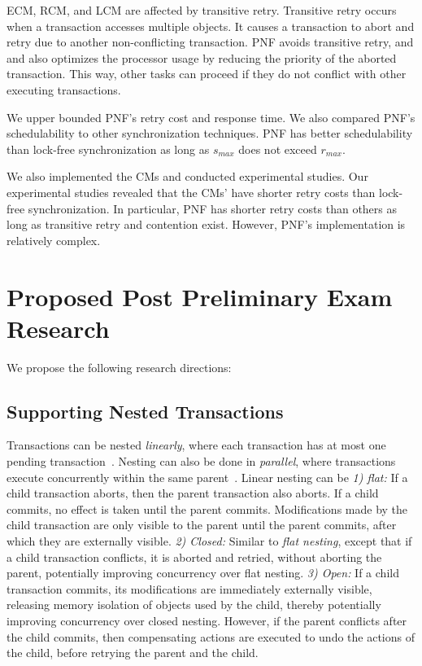 \documentclass[12pt,english]{report}
\begin{document}
ECM, RCM, and LCM are affected by transitive retry. Transitive retry occurs when a transaction accesses multiple objects. It causes a transaction to abort and retry  due to another non-conflicting transaction. PNF avoids transitive retry, and and also optimizes the processor usage by reducing the priority of the aborted transaction. This way, other tasks can proceed if they do not conflict with other executing transactions. 

We upper bounded PNF's retry cost and response time. We also compared PNF's schedulability to other synchronization techniques. PNF has better schedulability than lock-free synchronization as long as $s_{max}$ does not exceed $r_{max}$. 

We also implemented the CMs and conducted experimental studies. Our experimental studies revealed that the CMs' have shorter retry costs than lock-free synchronization. In particular, PNF has shorter retry costs than others as long as transitive retry and contention exist. However, PNF's implementation is relatively complex. 



\section{Proposed Post Preliminary Exam Research}

We propose the following research directions:

\subsection{Supporting Nested Transactions} 

Transactions can be nested \textit{linearly}, where each transaction has at most one pending transaction~\cite{Moss2006186}. Nesting can also be done in \textit{parallel}, where transactions execute concurrently within the same parent~\cite{volos2009nepaltm}. Linear nesting can be \textit{1) flat:} If a child transaction aborts, then the parent transaction also aborts. If a child commits, no effect is taken until the parent commits. Modifications made by the child transaction are only visible to the parent until the parent commits, after which they are externally visible. 
%
\textit{2) Closed:} Similar to \textit{flat nesting}, except that if a child transaction conflicts, it is aborted and retried, without aborting the parent, potentially improving concurrency over flat nesting. 
%
\textit{3) Open:} If a child transaction commits, its modifications are immediately externally visible, releasing memory isolation  of objects used by the child, thereby potentially improving concurrency over closed nesting. However, if the parent conflicts after the child commits, then compensating actions are executed to undo the actions of the child, before retrying the parent and the child. 
\end{document}
